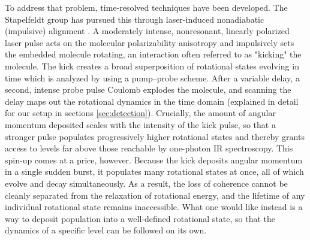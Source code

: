 To address that problem, time-resolved techniques have been developed. The Stapelfeldt group has pursued this through laser-induced nonadiabatic (impulsive) alignment \cite{chatterleyRotationalCoherenceSpectroscopy2020,pentlehnerImpulsiveLaserInduced2013,cherepanovExcitedRotationalStates2021}. A moderately intense, nonresonant, linearly polarized laser pulse acts on the molecular polarizability anisotropy and impulsively sets the embedded molecule rotating, an interaction often referred to as "kicking" the molecule. The kick creates a broad superposition of rotational states evolving in time which is analyzed by using a pump–probe scheme. After a variable delay, a second, intense probe pulse Coulomb explodes the molecule, and scanning the delay maps out the rotational dynamics in the time domain (explained in detail for our setup in sections \ref{sec:detection}). Crucially, the amount of angular momentum deposited scales with the intensity of the kick pulse, so that a stronger pulse populates progressively higher rotational states and thereby grants access to levels far above those reachable by one-photon IR spectroscopy. This spin-up comes at a price, however. Because the kick deposits angular momentum in a single sudden burst, it populates many rotational states at once, all of which evolve and decay simultaneously. As a result, the loss of coherence cannot be cleanly separated from the relaxation of rotational energy, and the lifetime of any individual rotational state remains inaccessible. What one would like instead is a way to deposit population into a well-defined rotational state, so that the dynamics of a specific level can be followed on its own.
